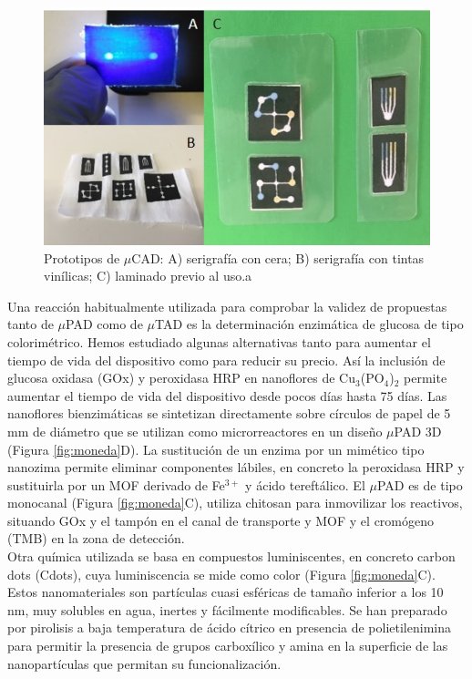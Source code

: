 \documentclass{article}
\begin{document}
\begin{figure}[h]
	\includegraphics[width=\textwidth]{tela}
	\caption{ Prototipos de $\mu$CAD: A) serigrafía con cera; B) serigrafía con tintas vinílicas; C) laminado previo al uso.a}
	\label{fig:tela}
\end{figure}
Una reacción habitualmente utilizada para comprobar la validez de propuestas tanto de $\mu$PAD\cite{Ariza-Avidad2016} como de $\mu$TAD es la determinación enzimática de glucosa de tipo colorimétrico. Hemos estudiado algunas alternativas tanto para aumentar el tiempo de vida del dispositivo como para reducir su precio. Así la inclusión de glucosa oxidasa (GOx) y peroxidasa HRP en nanoflores de Cu$_{3}$(PO$_{4}$)$_{2}$ permite aumentar el tiempo de vida del dispositivo desde pocos días hasta 75 días. Las nanoflores bienzimáticas se sintetizan directamente sobre círculos de papel de 5 mm de diámetro que se utilizan como microrreactores en un diseño $\mu$PAD 3D (Figura \ref{fig:moneda}D)\cite{Ariza-Avidad2016}. La sustitución de un enzima por un mimético tipo nanozima permite eliminar componentes lábiles, en concreto la peroxidasa HRP y sustituirla por un MOF derivado de Fe$^{3+}$ y ácido tereftálico. El $\mu$PAD es de tipo monocanal (Figura \ref{fig:moneda}C), utiliza chitosan para inmovilizar los reactivos, situando GOx y el tampón en el canal de transporte y MOF y el cromógeno (TMB) en la zona de detección\cite{Ortiz-Gomez2018}.\\

Otra química utilizada se basa en compuestos luminiscentes, en concreto carbon dots (Cdots), cuya luminiscencia se mide como color (Figura \ref{fig:moneda}C). Estos nanomateriales son partículas cuasi esféricas de tamaño inferior a los 10 nm, muy solubles en agua, inertes y fácilmente modificables. Se han preparado por pirolisis a baja temperatura de ácido cítrico en presencia de polietilenimina para permitir la presencia de grupos carboxílico y amina en la superficie de las nanopartículas que permitan su funcionalización\cite{Pedro2014}.\\
 
\end{document}
